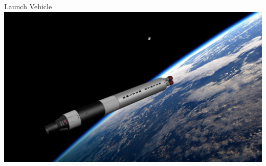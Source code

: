 \documentclass[10pt]{beamer}
\begin{document}
	\begin{frame}{Launch Vehicle}
		\includegraphics[width=\textwidth]{Launch_Vehicle.png}
	\end{frame}
\end{document}
